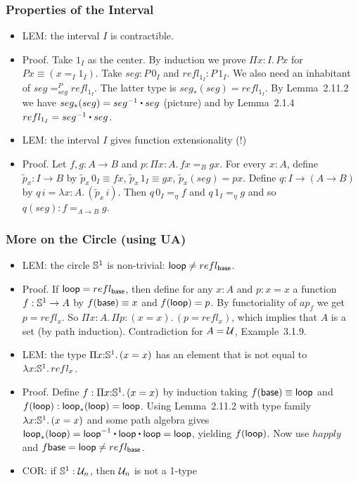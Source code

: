 \documentclass[handout]{beamer}
\newcommand{\depi}[3]{\Pi{#1{:}#2.\,#3}}
\newcommand{\lamt}[3]{\lambda{#1{:}#2.\,#3}}
\newcommand{\UU}{{\cal U}}
\newcommand{\ct}{%
  \mathchoice{\mathbin{\raisebox{0.5ex}{$\displaystyle\centerdot$}}}%
             {\mathbin{\raisebox{0.5ex}{$\centerdot$}}}%
             {\mathbin{\raisebox{0.25ex}{$\scriptstyle\,\centerdot\,$}}}%
             {\mathbin{\raisebox{0.1ex}{$\scriptscriptstyle\,\centerdot\,$}}}
}
\begin{document}
 \frame
  {
    \frametitle{Properties of the Interval}
    
\begin{itemize}    
    \item LEM: the interval $I$ is contractible.
    \item Proof. Take $1_I$ as the center. By induction we prove $\depi{x}{I}{Px}$
    for $Px \equiv (x =_I 1_I)$. Take $seg : P\,0_I$ and $refl_{1_I} : P\,1_I$.
    We also need an inhabitant of $seg =^P_{seg} refl_{1_I}$. 
    The latter type is $seg_*(seg) = refl_{1_I} $.
    By Lemma~2.11.2 we have  $seg_*(seg) = seg^{-1}\ct seg$ (picture) and 
    by Lemma~2.1.4 $refl_{1_I}  = seg^{-1}\ct seg$.    
    \item LEM: the interval $I$ gives function extensionality (!)
    \item Proof. Let $f,g: A\to B$ and $p:\depi{x}{A}{fx =_B gx}$. For every $x:A$,
    define $\tilde{p}_x : I \to B$ by $\tilde{p}_x\,0_I \equiv fx$, 
    $\tilde{p}_x\,1_I \equiv gx$, $\tilde{p}_x(seg) = px$. 
    Define $q: I \to (A\to B)$ by $q\,i=\lamt{x}{A}{(\tilde{p}_x\,i)}$.
    Then $q\,0_I =_\eta f$ and  $q\,1_I =_\eta g$ and so $q(seg): f=_{A\to B}g$.
 \end{itemize}
  }
  
                     
  \frame
  {
    \frametitle{More on the Circle (using UA)}
    
\begin{itemize}    
    \item LEM: the circle $\mathbb{S}^1$ is non-trivial: $\mathsf{loop} \neq refl_{\mathsf{base}}$.
    \item Proof. If $\mathsf{loop} = refl_{\mathsf{base}}$, then define for any $x:A$ and $p: x=x$
    a function $f:\mathbb{S}^1\to A$ by $f(\mathsf{base})\equiv x$ and $f(\mathsf{loop}) = p$.
    By functoriality of $ap_f$ we get $p=refl_x$. 
    So $\depi{x}{A}{\depi{p}{(x=x)}{(p=refl_x)}}$,
    which implies that $A$ is a set (by path induction).
    Contradiction for $A=\UU$, Example~3.1.9.
    \item LEM: the type $\depi{x}{\Sn^1}{(x=x)}$ has an element 
    that is not equal to $\lamt{x}{\Sn^1}{refl_x}$.
    \item Proof. Define $f:\depi{x}{\Sn^1}{(x=x)}$ by induction
    taking $f(\mathsf{base})\equiv \mathsf{loop}$ and $f(\mathsf{loop}): \mathsf{loop}_*(\mathsf{loop}) = \mathsf{loop}$.
    Using Lemma~2.11.2 with type family $\lamt{x}{\Sn^1}{(x=x)}$ and some path
    algebra gives $\lloop_*(\lloop)= \lloop^{-1}\ct \lloop\ct \lloop = \lloop$,
    yielding $f(\mathsf{loop})$. Now  use $happly$ and $f\mathsf{base} = \mathsf{loop} \neq {refl_{\mathsf{base}}}$.
    \item COR: if $\Sn^1: \UU_n$, then $\UU_n$ is not a 1-type
    
 \end{itemize}
  }
\end{document}
